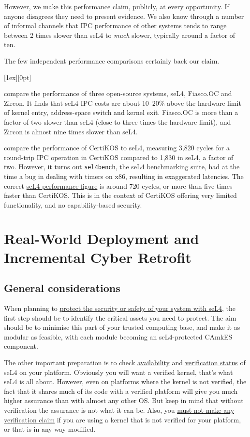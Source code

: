 \documentclass[english,a4paper,12pt\ifDraft,draft\fi]{report}
\newcommand{\Sect}[1]{\section{#1}}
\newcommand{\SSect}[1]{\subsection{#1}}
\newcommand{\Sect}[1]{\chapter{#1}}
\newcommand{\SSect}[1]{\section{#1}}
\newcommand{\code}[1]{\texttt{#1}}
\newlength{\chillilng}\setlength{\chillilng}{8mm}
\newlength{\chillimarg}\setlength{\chillimarg}{10mm}
\newcommand{\chilli}{\texttt{[image: chilli]}}
\newcommand{\chilliItem}{\raisebox{-5mm}[1ex][0pt]{%
      \makebox[\chillilng][r]{\chilli}}}
\newenvironment{Chilli}{
    \begin{list}{}{
      \setlength{\labelwidth}{\chillilng}
      \setlength{\leftmargin}{\chillimarg}}
    \item[\chilliItem]
    }
  {\end{list}}
\begin{document}
  However, we make this performance claim, publicly, at every
  opportunity. If anyone disagrees they need to present evidence. We
  also know through a number of informal channels that IPC performance
  of other systems tends to range between 2 times slower than seL4
  to \emph{much} slower, typically around a factor of ten.

  The few independent performance comparisons certainly back our claim.

  \begin{Chilli}
    \citet{Mi_LYWC_19} compare the performance of three open-source
    systems, seL4, Fiasco.OC and Zircon. It finds that seL4 IPC costs
    are about 10--20\% above the hardware limit of kernel entry,
    address-space switch and kernel exit. Fiasco.OC is more than a factor
    of two slower than seL4 (close to three times the hardware limit),
    and Zircon is almost nine times slower than seL4.

    \citet{Gu_SCWKSC_16} compare the performance of CertiKOS to seL4,
    measuring 3,820 cycles for a round-trip IPC operation in CertiKOS
    compared to 1,830 in seL4, a factor of two. However, it turns out
    \code{sel4bench}, the seL4 benchmarking suite, had at the time a
    bug in dealing with timers on x86, resulting in exaggerated
    latencies. The correct
    \href{https://sel4.systems/About/Performance/}{seL4 performance
      figure} is around 720 cycles, or more than five times faster
    than CertiKOS. This is in the context of CertiKOS offering very
    limited functionality, and no capability-based security.
  \end{Chilli}

  \Sect{Real-World Deployment and Incremental Cyber
    Retrofit}\label{s:retrofit}

  \SSect{General considerations}

  When planning to \href{https://sel4.systems/Use/}{protect the
    security or safety of your system with seL4}, the first step
  should be to identify the critical assets you need to protect. The
  aim should be to minimise this part of your trusted computing base,
  and make it as modular as feasible, with each module becoming an
  seL4-protected CAmkES component.

  The other important preparation is to check
  \href{https://docs.sel4.systems/Hardware/}{availability}  and
  \href{https://docs.sel4.systems/projects/sel4/verified-configurations.html}{verification
    status} of seL4 on your platform. Obviously you will want a
  verified kernel, that's what seL4 is all about. However, even on
  platforms where the kernel is not verified, the fact that it shares
  much of its code with a verified platform will give you much higher
  assurance than with almost any other OS. But keep in mind that
  without verification the assurance is not what it can be. Also, you
  \href{https://sel4.systems/Foundation/Trademark/}{must not make any verification claim} if you are using a kernel
  that is not verified for your platform, or that is in any way
  modified.
\end{document}
